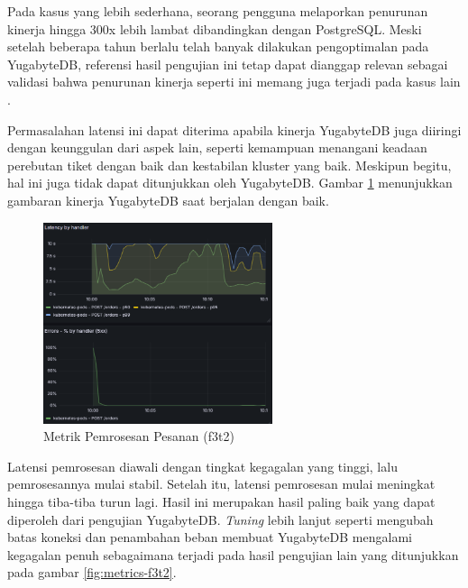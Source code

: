 Pada kasus yang lebih sederhana, seorang pengguna melaporkan penurunan kinerja hingga 300x lebih lambat dibandingkan dengan PostgreSQL. Meski setelah beberapa tahun berlalu telah banyak dilakukan pengoptimalan pada YugabyteDB, referensi hasil pengujian ini tetap dapat dianggap relevan sebagai validasi bahwa penurunan kinerja seperti ini memang juga terjadi pada kasus lain \parencite{yugabyteIssuePerformance}.

Permasalahan latensi ini dapat diterima apabila kinerja YugabyteDB juga diiringi dengan keunggulan dari aspek lain, seperti kemampuan menangani keadaan perebutan tiket dengan baik dan kestabilan kluster yang baik. Meskipun begitu, hal ini juga tidak dapat ditunjukkan oleh YugabyteDB. Gambar \ref{fig:metrics-f3t1} menunjukkan gambaran kinerja YugabyteDB saat berjalan dengan baik.

\begin{figure}[htbp]
    \centering
    \includegraphics[width=0.6\textwidth]{resources/chapter-4/latensi-yugabyte-success.png}
    \caption{Metrik Pemrosesan Pesanan (f3t2)}
    \label{fig:metrics-f3t1}
\end{figure}

Latensi pemrosesan diawali dengan tingkat kegagalan yang tinggi, lalu pemrosesannya mulai stabil. Setelah itu, latensi pemrosesan mulai meningkat hingga tiba-tiba turun lagi. Hasil ini merupakan hasil paling baik yang dapat diperoleh dari pengujian YugabyteDB. \textit{Tuning} lebih lanjut seperti mengubah batas koneksi dan penambahan beban membuat YugabyteDB mengalami kegagalan penuh sebagaimana terjadi pada hasil pengujian lain yang ditunjukkan pada gambar \ref{fig:metrics-f3t2}.

